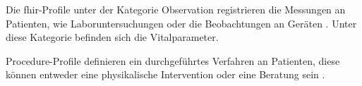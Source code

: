 Die \ac{fhir}-Profile unter der Kategorie \glqq Observation\grqq{} registrieren die Messungen an Patienten, wie Laboruntersuchungen oder die Beobachtungen an Geräten \cite{observation}. Unter diese Kategorie befinden sich die Vitalparameter.

\glqq Procedure\grqq{}-Profile definieren ein durchgeführtes Verfahren an Patienten, diese können entweder eine physikalische Intervention oder eine Beratung sein \cite{procedure}.
